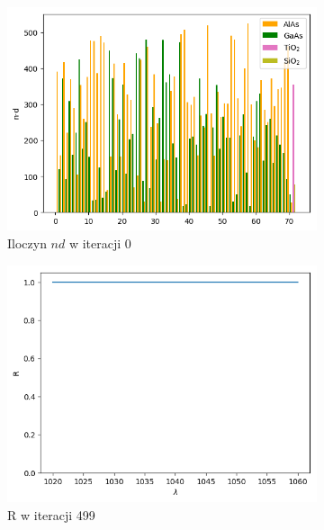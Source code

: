 \begin{figure} [H]
\begin{subfigure}[b]{0.32\textwidth}
        \includegraphics[width=\linewidth]{figures/wyniki/2stopien/result_ndresult0.png}
        \caption{Iloczyn $nd$ w iteracji 0}
    \end{subfigure}
        \begin{subfigure}[b]{0.30\textwidth}
        \includegraphics[width=\linewidth]{figures/wyniki/2stopien/result_Rresult499.png}
        \caption{R w iteracji 499}
    \end{subfigure}
        \begin{subfigure}[b]{0.31\textwidth}

\end{subfigure}
\end{figure}
